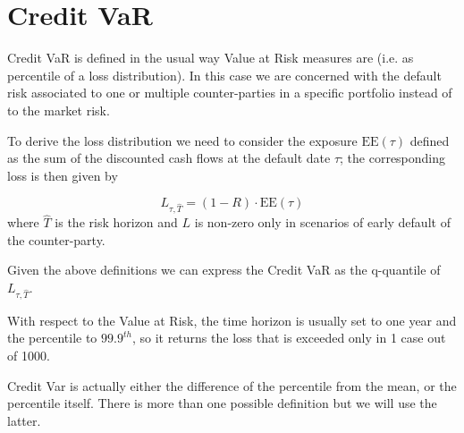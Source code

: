 \section{Credit VaR}\label{credit-var-cr-var}


Credit VaR is defined in the usual way Value at Risk measures are (i.e. as percentile of a loss distribution).
In this case we are concerned with the default risk associated to one or
multiple counter-parties in a specific portfolio instead of to the market risk.

To derive the loss distribution we need to consider the exposure $\textrm{EE}(\tau)$ defined as the sum 
of the discounted cash flows at the default date $\tau$; 
the corresponding loss is then given by

\begin{equation}L_{\tau, \hat{T}} = (1 - R) \cdot \textrm{EE}(\tau)\end{equation}
where \(\hat{T}\) is the risk horizon and $L$ is non-zero only in
scenarios of early default of the counter-party. 

Given the above definitions we can express the Credit VaR as the 
q-quantile of $L_{\tau, \hat{T}}$.

With respect to the Value at Risk, the time horizon is usually set to one year  and the percentile to $99.9^{th}$, so it returns the loss that is 
exceeded only in 1 case out of 1000. 

Credit Var is actually either the difference of the percentile from the mean, or the percentile itself. There is more than one possible definition but we  will use the latter.


%

